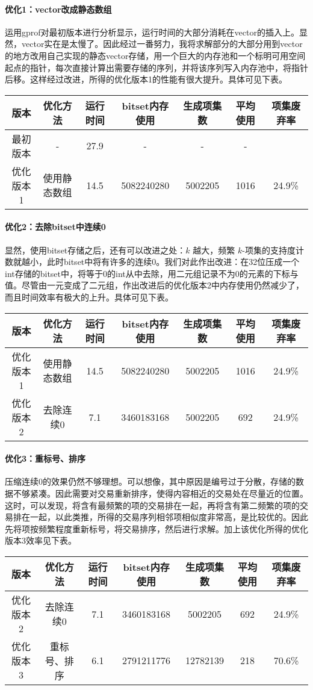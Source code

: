 \documentclass[a4paper,9pt]{article}
\begin{document}
\paragraph{优化1：vector改成静态数组}
运用gprof对最初版本进行分析显示，运行时间的大部分消耗在vector的插入上。显然，vector实在是太慢了。因此经过一番努力，我将求解部分的大部分用到vector的地方改用自己实现的静态vector存储，用一个巨大的内存池和一个标明可用空间起点的指针，每次直接计算出需要存储的序列，并将该序列写入内存池中，将指针后移。这样经过改进，所得的优化版本1的性能有很大提升。具体可见下表。
\begin{center}
	\begin{tabular}{ccccccc}
		版本&优化方法&运行时间&bitset内存使用&生成项集数&平均使用&项集废弃率\\\hline
		最初版本&-&27.9&-&-&-\\
		优化版本1&使用静态数组&14.5&5082240280&5002205&1016&24.9\%
	\end{tabular}
\end{center}

\paragraph{优化2：去除bitset中连续0}
显然，使用bitset存储之后，还有可以改进之处：$k$ 越大，频繁 $k$-项集的支持度计数就越小，此时bitset中将有许多的连续0。我们对此作出改进：在32位压成一个int存储的bitset中，将等于0的int从中去除，用二元组记录不为0的元素的下标与值。尽管由一元变成了二元组，作出改进后的优化版本2中内存使用仍然减少了，而且时间效率有极大的上升。具体可见下表。
\begin{center}
	\begin{tabular}{ccccccc}
		版本&优化方法&运行时间&bitset内存使用&生成项集数&平均使用&项集废弃率\\\hline
		优化版本1&使用静态数组&14.5&5082240280&5002205&1016&24.9\%\\
		优化版本2&去除连续0&7.1&3460183168&5002205&692&24.9\%
	\end{tabular}
\end{center}

\paragraph{优化3：重标号、排序}
压缩连续0的效果仍然不够理想。可以想像，其中原因是编号过于分散，存储的数据不够紧凑。因此需要对交易重新排序，使得内容相近的交易处在尽量近的位置。这时，可以发现，将含有最频繁的项的交易排在一起，再将含有第二频繁的项的交易排在一起，以此类推，所得的交易序列相邻项相似度非常高，是比较优的。因此先将项按频繁程度重新标号，将交易排序，然后进行求解。加上该优化所得的优化版本3效率见下表。
\begin{center}
	\begin{tabular}{ccccccc}
		版本&优化方法&运行时间&bitset内存使用&生成项集数&平均使用&项集废弃率\\\hline
		优化版本2&去除连续0&7.1&3460183168&5002205&692&24.9\%\\
		优化版本3&重标号、排序&6.1&2791211776&12782139&218&70.6\%
	\end{tabular}
\end{center}
\end{document}
